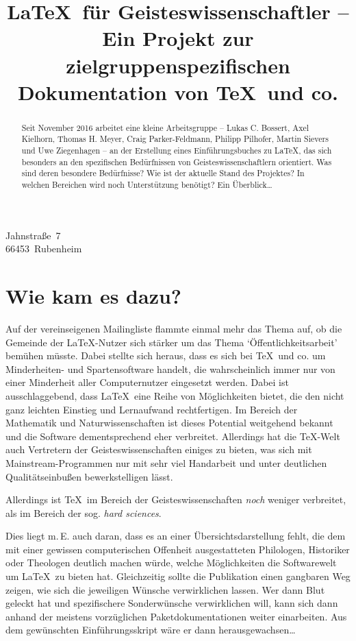 \documentclass[ngerman]{dtk}
\begin{document}
	
	
\title{\LaTeX\ für Geisteswissenschaftler -- 
    Ein Projekt zur zielgruppenspezifischen Dokumentation von \TeX\ und co.}
%
	{Jahnstraße~7\\
	66453~Rubenheim\\
	}
\maketitle


\begin{abstract}
Seit November 2016 arbeitet eine kleine Arbeitsgruppe 
-- Lukas C. Bossert, 
Axel Kielhorn, 
Thomas H. Meyer, 
Craig Parker-Feldmann, 
Philipp Pilhofer, 
Martin Sievers 
und Uwe Ziegenhagen --
an der Erstellung eines Einführungsbuches zu \LaTeX ,
das sich besonders an den spezifischen Bedürfnissen von Geisteswissenschaftlern orientiert.
Was sind deren besondere Bedürfnisse?
Wie ist der aktuelle Stand des Projektes?
In welchen Bereichen wird noch Unterstützung benötigt?
Ein Überblick\ldots 
\end{abstract}

\section{Wie kam es dazu?}

Auf der vereinseigenen Mailingliste flammte einmal mehr das Thema auf, ob die Gemeinde der \LaTeX -Nutzer
sich stärker um das Thema \enquote*{Öffentlichkeitsarbeit} bemühen müsste.
Dabei stellte sich heraus, dass es sich bei \TeX\ und co. um Minderheiten- und Spartensoftware handelt, die
wahrscheinlich immer nur von einer Minderheit aller Computernutzer eingesetzt werden.
Dabei ist ausschlaggebend, dass \LaTeX\ eine Reihe von Möglichkeiten bietet, die den nicht ganz leichten Einstieg
und Lernaufwand rechtfertigen. 
Im Bereich der Mathematik und Naturwissenschaften ist dieses Potential weitgehend bekannt und die Software
dementsprechend eher verbreitet.
Allerdings hat die \TeX -Welt auch Vertretern der Geisteswissenschaften einiges zu bieten, was sich mit 
Mainstream-Programmen nur mit sehr viel Handarbeit und unter deutlichen Qualitätseinbußen bewerkstelligen lässt.

Allerdings ist \TeX\ im Bereich der Geisteswissenschaften \emph{noch} weniger verbreitet, als im Bereich der
sog. \emph{hard sciences}.

Dies liegt m.\,E. auch daran, dass es an einer Übersichtsdarstellung fehlt, die dem mit einer gewissen 
computerischen Offenheit ausgestatteten Philologen, Historiker oder Theologen deutlich machen würde,
welche Möglichkeiten die Softwarewelt um \LaTeX\ zu bieten hat. 
Gleichzeitig sollte die Publikation einen gangbaren Weg zeigen, wie sich die jeweiligen Wünsche verwirklichen
lassen. Wer dann Blut geleckt hat und spezifischere Sonderwünsche verwirklichen will, kann sich dann anhand
der meistens vorzüglichen Paketdokumentationen weiter einarbeiten. 
Aus dem gewünschten Einführungsskript wäre er dann herausgewachsen\ldots 
\end{document}
